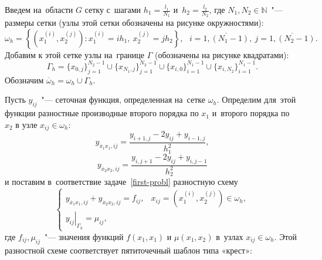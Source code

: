 \documentclass[11pt,a4paper,twoside]{report}
\numberwithin{equation}{section}
\theoremstyle{definition}
\theoremstyle{plain}
\begin{document}
Введем на~области $G$ сетку с~шагами $h_1=\frac{l_1}{N_1}$
и~$h_2=\frac{l_2}{N_2}$, где $N_1,N_2\in\mathbb{N}$~"--- размеры сетки
(узлы этой сетки обозначены на рисунке окружностями):
%
$$
    \omega_h = \left\{\left(x_1^{(i)}, x_2^{(j)}\right):
        x_1^{(i)}=ih_1,~x_2^{(j)} = jh_2
    \right\},~~~i=\overline{1,(N_1-1)},~j=\overline{1,(N_2-1)}.
$$
%
Добавим к этой сетке узлы на~границе $\Gamma$ (обозначены на рисунке квадратами):
%
$$
    \Gamma_h = \{x_{0,j}\}_{j=1}^{N_2-1} \cup \{x_{N_1,j}\}_{j=1}^{N_2-1} \cup
        \{x_{i,0}\}_{i=1}^{N_1-1} \cup \{x_{i,N_2}\}_{i=1}^{N_1-1}.
$$
%
Обозначим $\overline{\omega}_h = \omega_h\cup\Gamma_h$.
\vspace{1em}
\begin{figure}[H]
\centering
{}
\end{figure}
\vspace{1em}

Пусть $y_{ij}$~"--- сеточная функция, определенная на~сетке $\omega_h$.
Определим для~этой функции разностные производные второго порядка по $x_1$
и~второго порядка по~$x_2$ в узле $x_{ij}\in\omega_h$:
%
$$
    y_{\overline{x}_1x_1,ij}
    = \frac{y_{i+1,j} - 2y_{ij} + y_{i-1,j}}{h_1^2},
$$
%
%
$$
    y_{\overline{x}_2x_2,ij}
    = \frac{y_{i,j+1} - 2y_{ij} + y_{i,j-1}}{h_2^2}
$$
%
и поставим в~соответствие задаче~\eqref{first-probl} разностную схему
%
\begin{equation}
    \label{eq:ION}
    \begin{cases}
        y_{\overline{x}_1x_1,ij}+y_{\overline{x}_2x_2,ij}=f_{ij}, &
            x_{ij} = \left(x_1^{(i)}, x_2^{(j)}\right) \in \omega_h,\\
        \left.y_{ij}\right\vert_{\Gamma_h} = \mu_{ij}, &
    \end{cases}
\end{equation}
%
где $f_{ij}, \mu_{ij}$~"--- значения функций
$f(x_1, x_1)$ и $\mu(x_1,x_2)$ в~узлах $x_{ij}\in\omega_h$.
Этой разностной схеме соответствует пятиточечный шаблон типа «крест»:
\end{document}
